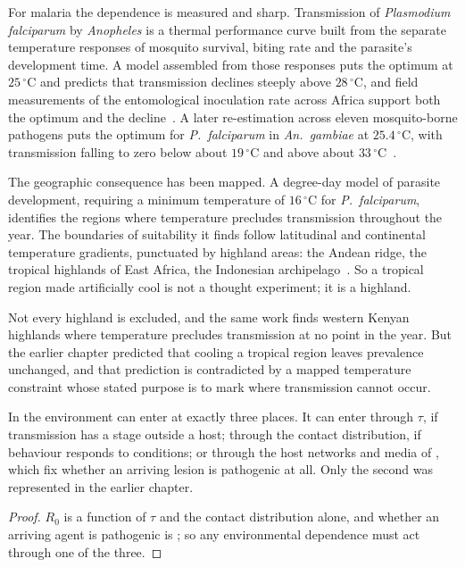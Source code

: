 For malaria the dependence is measured and sharp. Transmission of
\emph{Plasmodium falciparum} by \emph{Anopheles} is a thermal performance
curve built from the separate temperature responses of mosquito survival,
biting rate and the parasite's development time. A model assembled from
those responses puts the optimum at $25\,^{\circ}$C and predicts that
transmission declines steeply above $28\,^{\circ}$C, and field measurements
of the entomological inoculation rate across Africa support both the
optimum and the decline~\citep{mordecai2013optimal}. \lnkS{} A later
re-estimation across eleven mosquito-borne pathogens puts the optimum for
\emph{P.\ falciparum} in \emph{An.\ gambiae} at $25.4\,^{\circ}$C, with
transmission falling to zero below about $19\,^{\circ}$C and above about
$33\,^{\circ}$C~\citep{mordecai2019thermal}. \lnkS

The geographic consequence has been mapped. A degree-day model of parasite
development, requiring a minimum temperature of $16\,^{\circ}$C for
\emph{P.\ falciparum}, identifies the regions where temperature precludes
transmission throughout the year. The boundaries of suitability it finds
follow latitudinal and continental temperature gradients, punctuated by
highland areas: the Andean ridge, the tropical highlands of East Africa,
the Indonesian archipelago~\citep{gething2011modelling}. \lnkS{} So a
tropical region made artificially cool is not a thought experiment; it is a
highland.

Not every highland is excluded, and the same work finds western Kenyan
highlands where temperature precludes transmission at no point in the year.
But the earlier chapter predicted that cooling a tropical region leaves
prevalence unchanged, and that prediction is contradicted by a mapped
temperature constraint whose stated purpose is to mark where transmission
cannot occur.

\begin{proposition}
\label{sm:prop-environment}
\lnkD{} In  the environment can enter at exactly three
places. It can enter through $\tau$, if transmission has a stage outside a
host; through the contact distribution, if behaviour responds to conditions;
or through the host networks and media of , which fix
whether an arriving lesion is pathogenic at all. Only the second was
represented in the earlier chapter.
\end{proposition}

\begin{proof}
$R_0$ is a function of $\tau$ and the contact distribution alone, and
whether an arriving agent is pathogenic is ; so any
environmental dependence must act through one of the three.
\end{proof}

